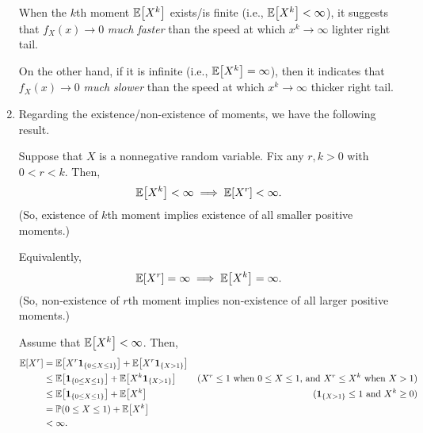 \begin{enumerate}
When the \(k\)th moment \(\mathbb{E}\qty[X^k]\) exists/is finite (i.e.,
\(\mathbb{E}\qty[X^k]<\infty\)), it suggests that \(f_X(x)\to 0\) \emph{much faster} than the
speed at which \(x^k\to\infty\)  lighter right tail.

On the other hand, if it is infinite (i.e., \(\mathbb{E}\qty[X^k]=\infty\)), then it
indicates that \(f_X(x)\to 0\) \emph{much slower} than the speed at which
\(x^k\to\infty\)  thicker right tail.

\item Regarding the existence/non-existence of moments, we have the following
result.
\begin{proposition}
\label{prp:high-low-moment-relation}
Suppose that \(X\) is a nonnegative random variable. Fix any \(r,k>0\) with
\(0<r<k\). Then,
\[
\mathbb{E}\qty[X^k]<\infty\implies \mathbb{E}\qty[X^r]<\infty.
\]
(So, existence of \(k\)th moment implies existence of
all smaller positive moments.)

\begin{note}
Equivalently,
\[
\mathbb{E}\qty[X^r]=\infty\implies \mathbb{E}\qty[X^k]=\infty.
\]
(So, non-existence of \(r\)th moment implies non-existence of
all larger positive moments.)
\end{note}
\end{proposition}
\begin{pf}
Assume that \(\mathbb{E}\qty[X^k]<\infty\). Then,
\begin{align*}
\mathbb{E}\qty[X^r]&=\mathbb{E}\qty[X^r\mathbf{1}_{\left\{0\le X\le 1\right\}}]+\mathbb{E}\qty[X^r\mathbf{1}_{\left\{X>1\right\}}]\\
&\le \mathbb{E}\qty[\mathbf{1}_{\left\{0\le X\le 1\right\}}]+\mathbb{E}\qty[X^k\mathbf{1}_{\left\{X>1\right\}}] &\text{(\(X^r \le 1\) when \(0\le X\le 1\), and \(X^r\le X^k\) when \(X>1\))}\\
&\le \mathbb{E}\qty[\mathbf{1}_{\left\{0\le X\le 1\right\}}]+\mathbb{E}\qty[X^k]&\text{(\(\mathbf{1}_{\left\{X>1\right\}}\le 1\) and \(X^k\ge 0\))}\\
&=\mathbb{P}\qty(0\le X\le 1)+\mathbb{E}\qty[X^k]\\
&<\infty.
\end{align*}
\end{pf}


\end{enumerate}
